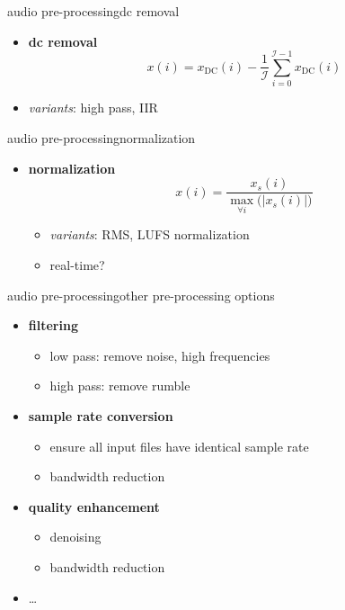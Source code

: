         \begin{frame}{audio pre-processing}{dc removal}
            \begin{itemize}
                \item   \textbf{dc removal}
                    \[
                        x(i) = x_{\mathrm{DC}}(i) - \frac{1}{\mathcal{I}}\sum\limits_{i=0}^{\mathcal{I}-1}{x_{\mathrm{DC}}(i)} 
                    \]
                \item   \textit{variants}: high pass, IIR
            \end{itemize}
        \end{frame}
        \begin{frame}{audio pre-processing}{normalization}
            \begin{itemize}
                \item   \textbf{normalization}
                    \[
                        x(i) = \frac{x_s(i)}{\max\limits_{\forall i}\big(|x_s(i)|\big)} 
                    \]
                    \begin{itemize}
                        \item   \textit{variants}: RMS, LUFS normalization
                        \item   real-time?
                    \end{itemize}
            \end{itemize}
        \end{frame}
        \begin{frame}{audio pre-processing}{other pre-processing options}
            \begin{itemize}
                \item   \textbf{filtering}
                    \begin{itemize}
                        \item   low pass: remove noise, high frequencies
                        \item   high pass: remove rumble
                    \end{itemize}
                \bigskip
                \item   \textbf{sample rate conversion}
                    \begin{itemize}
                        \item   ensure all input files have identical sample rate
                        \item   bandwidth reduction
                    \end{itemize}
                \bigskip
                \item   \textbf{quality enhancement} 
                    \begin{itemize}
                        \item   denoising
                        \item   bandwidth reduction
                    \end{itemize}
                \bigskip
                \item   \ldots
            \end{itemize}
        \end{frame}
        

